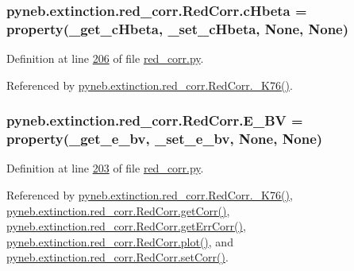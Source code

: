 \begin{DoxyVerb}
\hypertarget{classpyneb_1_1extinction_1_1red__corr_1_1_red_corr_aaf16ae2a0bdb5dd620f9db382ffeebc9}{
\subsubsection[{c\-Hbeta}]{\setlength{\rightskip}{0pt plus 5cm}pyneb.\-extinction.\-red\-\_\-corr.\-Red\-Corr.\-c\-Hbeta = property({\bf \-\_\-get\-\_\-c\-Hbeta}, {\bf \-\_\-set\-\_\-c\-Hbeta}, None, None)\hspace{0.3cm}{\ttfamily [static]}}}\label{classpyneb_1_1extinction_1_1red__corr_1_1_red_corr_aaf16ae2a0bdb5dd620f9db382ffeebc9}


Definition at line \hyperlink{red__corr_8py_source_l00206}{206} of file \hyperlink{red__corr_8py_source}{red\-\_\-corr.\-py}.



Referenced by \hyperlink{red__corr_8py_source_l00595}{pyneb.\-extinction.\-red\-\_\-corr.\-Red\-Corr.\-\_\-\-K76()}.

\hypertarget{classpyneb_1_1extinction_1_1red__corr_1_1_red_corr_a0bc581bcaa8eeeb67b83ffdec58bf164}{
\subsubsection[{E\-\_\-\-B\-V}]{\setlength{\rightskip}{0pt plus 5cm}pyneb.\-extinction.\-red\-\_\-corr.\-Red\-Corr.\-E\-\_\-\-B\-V = property({\bf \-\_\-get\-\_\-e\-\_\-bv}, {\bf \-\_\-set\-\_\-e\-\_\-bv}, None, None)\hspace{0.3cm}{\ttfamily [static]}}}\label{classpyneb_1_1extinction_1_1red__corr_1_1_red_corr_a0bc581bcaa8eeeb67b83ffdec58bf164}


Definition at line \hyperlink{red__corr_8py_source_l00203}{203} of file \hyperlink{red__corr_8py_source}{red\-\_\-corr.\-py}.



Referenced by \hyperlink{red__corr_8py_source_l00595}{pyneb.\-extinction.\-red\-\_\-corr.\-Red\-Corr.\-\_\-\-K76()}, \hyperlink{red__corr_8py_source_l00211}{pyneb.\-extinction.\-red\-\_\-corr.\-Red\-Corr.\-get\-Corr()}, \hyperlink{red__corr_8py_source_l00251}{pyneb.\-extinction.\-red\-\_\-corr.\-Red\-Corr.\-get\-Err\-Corr()}, \hyperlink{red__corr_8py_source_l00303}{pyneb.\-extinction.\-red\-\_\-corr.\-Red\-Corr.\-plot()}, and \hyperlink{red__corr_8py_source_l00281}{pyneb.\-extinction.\-red\-\_\-corr.\-Red\-Corr.\-set\-Corr()}.


\end{DoxyVerb}
